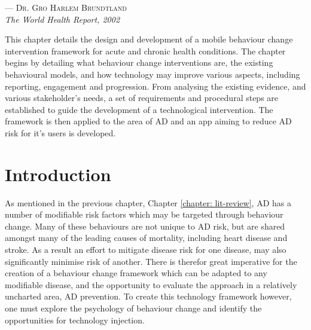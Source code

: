  \label{chapter: prevention-framework}

\setlength{\epigraphwidth}{.50\textwidth}
\begin{epigraphs}
{--- \textsc{Dr. Gro Harlem Brundtland} \\ \textit{The World Health Report, 2002}}
\end{epigraphs}

This chapter details the design and development of a mobile behaviour change intervention framework for acute and chronic health conditions. The chapter begins by detailing what behaviour change interventions are, the existing behavioural models, and how technology may improve various aspects, including reporting, engagement and progression. From analysing the existing evidence, and various stakeholder's needs, a set of requirements and procedural steps are established to guide the development of a technological intervention.
The framework is then applied to the area of AD and an app aiming to reduce AD risk for it's users is developed.

\section{Introduction}
As mentioned in the previous chapter, Chapter \ref{chapter: lit-review}, AD has a number of modifiable risk factors which may be targeted through behaviour change. Many of these behaviours are not unique to AD risk, but are shared amongst many of the leading causes of mortality, including heart disease and stroke. As a result an effort to mitigate disease risk for one disease, may also significantly minimise risk of another. There is therefor great imperative for the creation of a behaviour change framework which can be adapted to any modifiable disease, and the opportunity to evaluate the approach in a relatively uncharted area, AD prevention. To create this technology framework however, one must explore the psychology of behaviour change and identify the opportunities for technology injection.

